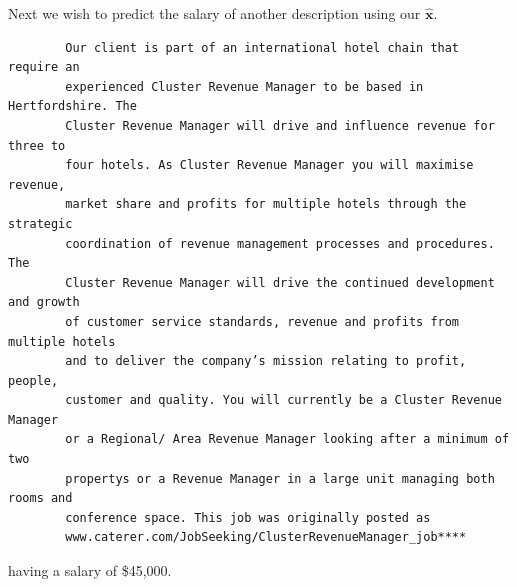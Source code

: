 \documentclass[12pt]{article}
\begin{document}
    \begin{center} 
        
        
    \end{center}
    
    Next we wish to predict the salary of another description using our
    $\bm{\hat{x}}$. 

    \begin{lstlisting}
        Our client is part of an international hotel chain that require an
        experienced Cluster Revenue Manager to be based in Hertfordshire. The
        Cluster Revenue Manager will drive and influence revenue for three to
        four hotels. As Cluster Revenue Manager you will maximise revenue,
        market share and profits for multiple hotels through the strategic
        coordination of revenue management processes and procedures. The
        Cluster Revenue Manager will drive the continued development and growth
        of customer service standards, revenue and profits from multiple hotels
        and to deliver the company’s mission relating to profit, people,
        customer and quality. You will currently be a Cluster Revenue Manager
        or a Regional/ Area Revenue Manager looking after a minimum of two
        propertys or a Revenue Manager in a large unit managing both rooms and
        conference space. This job was originally posted as
        www.caterer.com/JobSeeking/ClusterRevenueManager_job****
    \end{lstlisting} having a salary of \$45,000.
    
\end{document}
